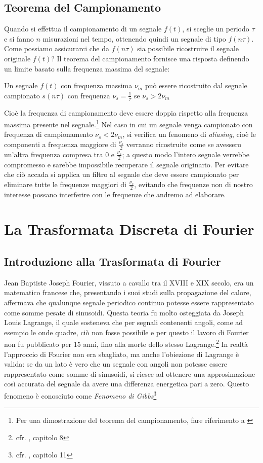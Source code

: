 \subsection{Teorema del Campionamento}
Quando si effettua il campionamento di un segnale $f(t)$, si sceglie un periodo
$\tau$ e si fanno $n$ misurazioni nel tempo, ottenendo quindi un segnale di
tipo $f(n\tau)$. Come possiamo assicurarci che da $f(n\tau)$ sia possibile
ricostruire il segnale originale $f(t)$?
Il teorema del campionamento fornisce una risposta definendo un limite basato
sulla frequenza massima del segnale:
\begin{theorem} \label{the:nyquist}
	Un segnale $f(t)$ con frequenza massima $\nu_m$ pu\`o essere ricostruito dal
	segnale campionato $s(n\tau)$ con frequenza $\nu_s = \frac{1}{\tau}$ se
	$\nu_s > 2\nu_m$
\end{theorem}
Cio\`e la frequenza di campionamento deve essere doppia rispetto alla frequenza
massima presente nel segnale.\footnote{Per una dimostrazione del teorema del
campionamento, fare riferimento a \cite{MDFT07}} Nel caso in cui un segnale venga campionato con
frequenza di campionamento $\nu_s < 2\nu_m$, si verifica un fenomeno di
\emph{aliasing}, cio\`e le componenti a frequenza maggiore di $\frac{\nu_s}{2}$
verranno ricostruite come se avessero un'altra frequenza compresa tra $0$ e
$\frac{\nu_s}{2}$; a questo modo l'intero segnale verrebbe compromesso e sarebbe
impossibile recuperare il segnale originario. Per evitare che ci\`o accada si
applica un filtro al segnale che deve essere campionato per eliminare tutte le
frequenze maggiori di $\frac{\nu_s}{2}$, evitando che frequenze non di nostro
interesse possano interferire con le frequenze che andremo ad elaborare.

\section{La Trasformata Discreta di Fourier}
\subsection{Introduzione alla Trasformata di Fourier}
Jean Baptiste Joseph Fourier, vissuto a cavallo tra il XVIII e XIX secolo, era
un matematico francese che, presentando i suoi  studi sulla propagazione del
calore, affermava che qualunque segnale periodico continuo potesse essere
rappresentato come somme pesate di sinusoidi. Questa teoria fu molto osteggiata
da Joseph Louis Lagrange, il quale sosteneva che per segnali contenenti angoli,
come ad esempio le onde quadre, ci\`o non fosse possibile e per questo il
lavoro di Fourier non fu pubblicato per 15 anni, fino alla morte dello stesso
Lagrange.\footnote{cfr. \cite{TSEGDSP97}, capitolo 8} In realt\`a l'approccio di
Fourier non era sbagliato, ma anche l'obiezione di Lagrange \`e valida: se da un
lato \`e vero che un segnale con angoli non potesse essere rappresentato come
somme di sinusoidi, si riesce ad ottenere una approsimazione cos\`i accurata del
segnale da avere una differenza energetica pari a zero.  Questo fenomeno \`e
conosciuto come \emph{Fenomeno di Gibbs}\footnote{cfr.  \cite{TSEGDSP97},
capitolo 11}


